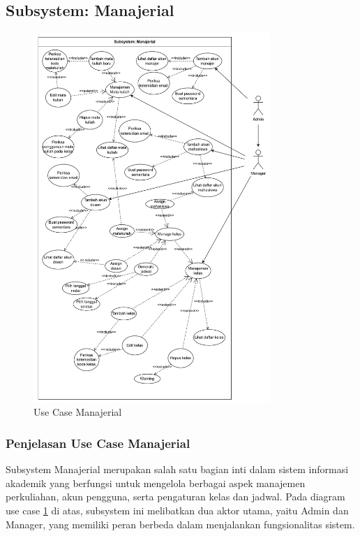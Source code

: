 \documentclass[a4paper,oneside,11pt]{book}
\begin{document}
\subsection{Subsystem: Manajerial}
\begin{figure}[H]
  \centering
  \includegraphics[width=0.8\textwidth]{USECASE/usecasemanajer.jpg}
  \caption{Use Case Manajerial}
  \label{fig:use_case_manajerial}
\end{figure}

\subsubsection{Penjelasan Use Case Manajerial}

Subsystem Manajerial merupakan salah satu bagian inti dalam sistem informasi akademik yang berfungsi untuk mengelola berbagai aspek manajemen perkuliahan, akun pengguna, serta pengaturan kelas dan jadwal. Pada diagram use case \ref{fig:use_case_manajerial} di atas, subsystem ini melibatkan dua aktor utama, yaitu Admin dan Manager, yang memiliki peran berbeda dalam menjalankan fungsionalitas sistem.
\end{document}
